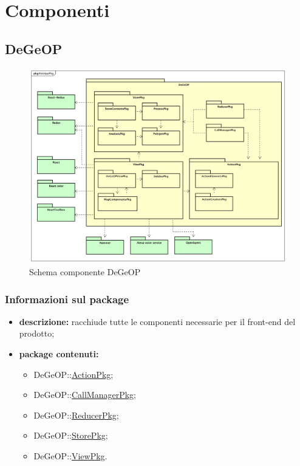 \section{Componenti} \label{componenti}
\subsection{DeGeOP}
\label{pkg::DeGeOP}
\begin{figure}[H]
	\centering
	\includegraphics[width=\textwidth]{img/PkgDiagram/STDeGeOPPkg.png}
	\caption{Schema componente DeGeOP}
\end{figure}
\subsubsection{Informazioni sul package}
\begin{itemize}
	\item \textbf{descrizione:} racchiude tutte le componenti necessarie per il front-end del prodotto;
	\item \textbf{package contenuti:}
	\begin{itemize}
		\item DeGeOP::\hyperref[pkg::ActionPkg]{ActionPkg};
		\item DeGeOP::\hyperref[pkg::CallManagerPkg]{CallManagerPkg};
		\item DeGeOP::\hyperref[pkg::ReducerPkg]{ReducerPkg};
		\item DeGeOP::\hyperref[pkg::StorePkg]{StorePkg};
		\item DeGeOP::\hyperref[pkg::ViewPkg]{ViewPkg}.
	\end{itemize}
\end{itemize}
\newpage
